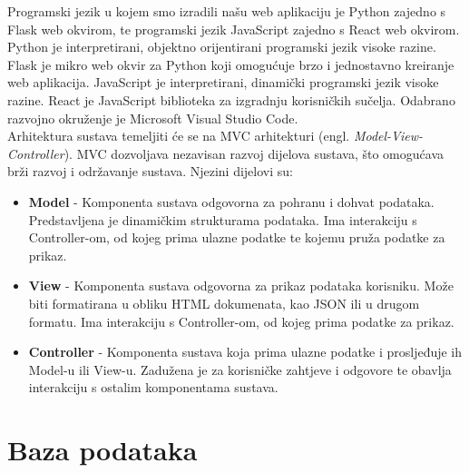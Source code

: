 	Programski jezik u kojem smo izradili našu web aplikaciju je Python zajedno s Flask web okvirom, te programski jezik JavaScript zajedno s React web okvirom. Python je interpretirani, objektno orijentirani programski jezik visoke razine. Flask je mikro web okvir za Python koji omogućuje brzo i jednostavno kreiranje web aplikacija. JavaScript je interpretirani, dinamički programski jezik visoke razine. React je JavaScript biblioteka za izgradnju korisničkih sučelja. Odabrano razvojno okruženje je Microsoft Visual Studio Code.\\
	Arhitektura sustava temeljiti će se na MVC arhitekturi (engl. \textit{Model-View-Controller}). MVC dozvoljava nezavisan razvoj dijelova sustava, što omogućava brži razvoj i održavanje sustava. Njezini dijelovi su:\\
	\begin{itemize}
		\item \textbf{Model} - Komponenta sustava odgovorna za pohranu i dohvat podataka. Predstavljena je dinamičkim strukturama podataka. Ima interakciju s Controller-om, od kojeg prima ulazne podatke te kojemu pruža podatke za prikaz.\\
		\item \textbf{View} - Komponenta sustava odgovorna za prikaz podataka korisniku. Može biti formatirana u obliku HTML dokumenata, kao JSON ili u drugom formatu. Ima interakciju s Controller-om, od kojeg prima podatke za prikaz.\\
		\item \textbf{Controller} - Komponenta sustava koja prima ulazne podatke i prosljeđuje ih Model-u ili View-u. Zadužena je za korisničke zahtjeve i odgovore te obavlja interakciju s ostalim komponentama sustava.\\
	\end{itemize}

	

	\pagebreak
				
		\section{Baza podataka}
			
			
		
